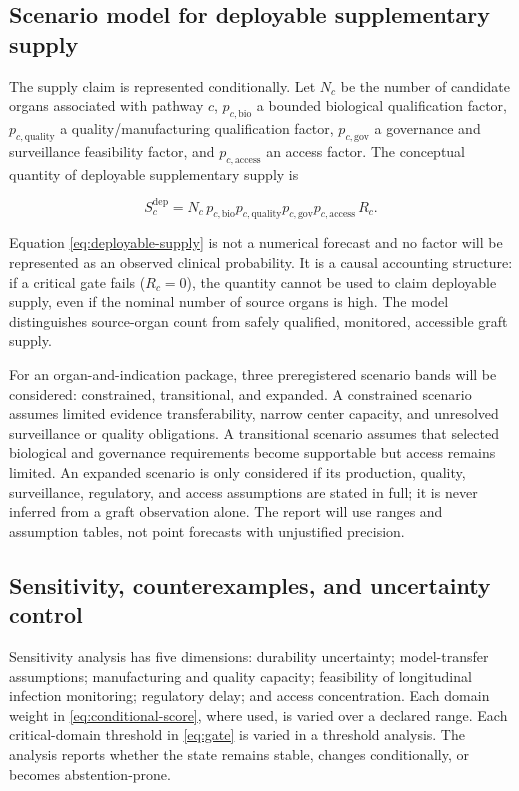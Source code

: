 \documentclass[conference]{IEEEtran}
\begin{document}
\subsection{Scenario model for deployable supplementary supply}

The supply claim is represented conditionally. Let $N_c$ be the number of candidate organs associated with pathway $c$, $p_{c,\mathrm{bio}}$ a bounded biological qualification factor, $p_{c,\mathrm{quality}}$ a quality/manufacturing qualification factor, $p_{c,\mathrm{gov}}$ a governance and surveillance feasibility factor, and $p_{c,\mathrm{access}}$ an access factor. The conceptual quantity of deployable supplementary supply is

\begin{equation}
S_c^{\mathrm{dep}}=N_c\,p_{c,\mathrm{bio}}p_{c,\mathrm{quality}}p_{c,\mathrm{gov}}p_{c,\mathrm{access}}\,R_c.
\label{eq:deployable-supply}
\end{equation}

Equation \eqref{eq:deployable-supply} is not a numerical forecast and no factor will be represented as an observed clinical probability. It is a causal accounting structure: if a critical gate fails ($R_c=0$), the quantity cannot be used to claim deployable supply, even if the nominal number of source organs is high. The model distinguishes source-organ count from safely qualified, monitored, accessible graft supply.

For an organ-and-indication package, three preregistered scenario bands will be considered: constrained, transitional, and expanded. A constrained scenario assumes limited evidence transferability, narrow center capacity, and unresolved surveillance or quality obligations. A transitional scenario assumes that selected biological and governance requirements become supportable but access remains limited. An expanded scenario is only considered if its production, quality, surveillance, regulatory, and access assumptions are stated in full; it is never inferred from a graft observation alone. The report will use ranges and assumption tables, not point forecasts with unjustified precision.

\subsection{Sensitivity, counterexamples, and uncertainty control}

Sensitivity analysis has five dimensions: durability uncertainty; model-transfer assumptions; manufacturing and quality capacity; feasibility of longitudinal infection monitoring; regulatory delay; and access concentration. Each domain weight in \eqref{eq:conditional-score}, where used, is varied over a declared range. Each critical-domain threshold in \eqref{eq:gate} is varied in a threshold analysis. The analysis reports whether the state remains stable, changes conditionally, or becomes abstention-prone.
\end{document}
